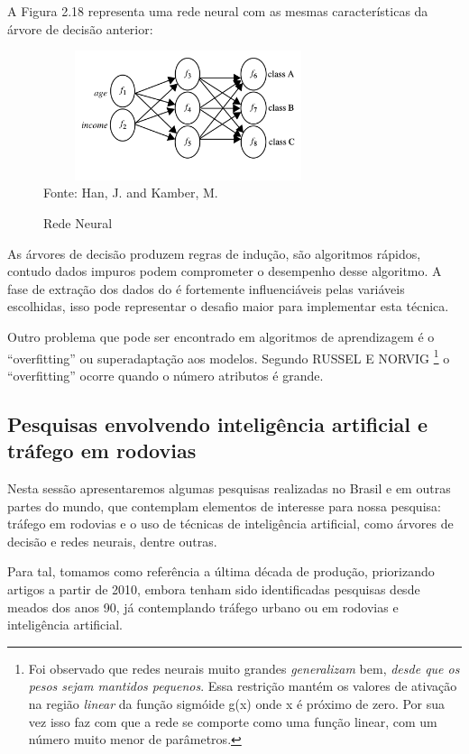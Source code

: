 A Figura 2.18 representa uma rede neural com as mesmas características da árvore de decisão anterior:
\begin{figure}[!ht]
	\centering
	\caption{Rede Neural}
	\includegraphics[width=85mm, height=38mm]{Figuras/BigData/redeneural.png}\\
	\tiny Fonte: Han, J. and Kamber, M. 
\end{figure}  

As árvores de decisão produzem regras de indução, são algoritmos rápidos, contudo dados impuros podem comprometer o desempenho desse algoritmo. 
A fase de extração dos dados do é fortemente influenciáveis pelas variáveis escolhidas, \cite{DecisionTree} 
isso pode representar o desafio maior para implementar esta técnica. 

Outro problema que pode ser encontrado em algoritmos de aprendizagem é o ``overfitting'' ou superadaptação aos modelos.
Segundo RUSSEL E NORVIG \cite{NorvigRussel2004}  \footnote{Foi observado que redes neurais muito grandes \textit{generalizam} bem, 
\textit{desde que os pesos sejam mantidos pequenos}. Essa restrição mantém os valores de ativação na região 
\textit{linear} da função sigmóide g(x) onde x é próximo de zero. Por sua vez isso faz com que a rede se comporte 
como uma função linear, com um número muito menor de parâmetros.} o ``overfitting'' ocorre quando o número atributos é grande.


\subsection{Pesquisas envolvendo inteligência artificial e tráfego em rodovias}

Nesta sessão apresentaremos algumas pesquisas realizadas no Brasil e em outras partes do mundo, que contemplam elementos de interesse para nossa pesquisa: tráfego em rodovias e o uso de técnicas de inteligência artificial, como árvores de decisão e redes neurais, dentre outras.

Para tal, tomamos como referência a última década de produção, priorizando artigos a partir de 2010, embora tenham sido identificadas pesquisas desde meados dos anos 90, já contemplando tráfego urbano ou em rodovias e inteligência artificial.

